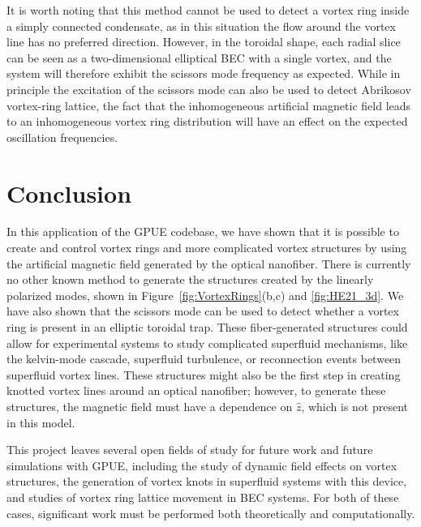 It is worth noting that this method cannot be used to detect a vortex ring inside a simply connected condensate, as in this situation the flow around the vortex line has no preferred direction.
However, in the toroidal shape, each radial slice can be seen as a two-dimensional elliptical BEC with a single vortex, and the system will therefore exhibit the scissors mode frequency as expected.
While in principle the excitation of the scissors mode can also be used to detect Abrikosov vortex-ring lattice, the fact that the inhomogeneous artificial magnetic field leads to an inhomogeneous vortex ring distribution will have an effect on the expected oscillation frequencies.

\section{Conclusion}

In this application of the GPUE codebase, we have shown that it is possible to create and control vortex rings and more complicated vortex structures by using the artificial magnetic field generated by the optical nanofiber.
There is currently no other known method to generate the structures created by the linearly polarized modes, shown in Figure~\ref{fig:VortexRings}(b,c) and \ref{fig:HE21_3d}.
We have also shown that the scissors mode can be used to detect whether a vortex ring is present in an elliptic toroidal trap.
These fiber-generated structures could allow for experimental systems to study complicated superfluid mechanisms, like the kelvin-mode cascade, superfluid turbulence, or reconnection events between superfluid vortex lines.
These structures might also be the first step in creating knotted vortex lines around an optical nanofiber; however, to generate these structures, the magnetic field must have a dependence on $\hat z$, which is not present in this model.

This project leaves several open fields of study for future work and future simulations with GPUE, including the study of dynamic field effects on vortex structures, the generation of vortex knots in superfluid systems with this device, and studies of vortex ring lattice movement in BEC systems.
For both of these cases, significant work must be performed both theoretically and computationally.

